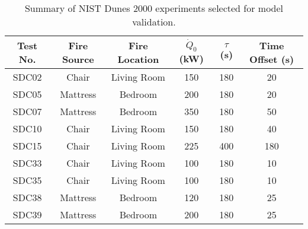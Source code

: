 \begin{table}[h!]
\caption{Summary of NIST Dunes 2000 experiments selected for model validation.}
\begin{center}
\begin{tabular}{|c|c|c|c|c|c|}
\hline
Test No.  &  Fire Source  &  Fire Location  &  $\dot Q_0$ (kW)  &  $\tau$ (s)  &  Time Offset (s)  \\ \hline \hline
SDC02     &  Chair        &  Living Room    &  150              &  180         &  20               \\ \hline
SDC05     &  Mattress     &  Bedroom        &  200              &  180         &  20               \\ \hline
SDC07     &  Mattress     &  Bedroom        &  350              &  180         &  50               \\ \hline
SDC10     &  Chair        &  Living Room    &  150              &  180         &  40               \\ \hline
SDC15     &  Chair        &  Living Room    &  225              &  400         &  180              \\ \hline
SDC33     &  Chair        &  Living Room    &  100              &  180         &  10               \\ \hline
SDC35     &  Chair        &  Living Room    &  100              &  180         &  10               \\ \hline
SDC38     &  Mattress     &  Bedroom        &  120              &  180         &  25               \\ \hline
SDC39     &  Mattress     &  Bedroom        &  200              &  180         &  25               \\ \hline
\end{tabular}
\end{center}
\label{tab:NIST_Dunes_2000_Summary}
\end{table}




